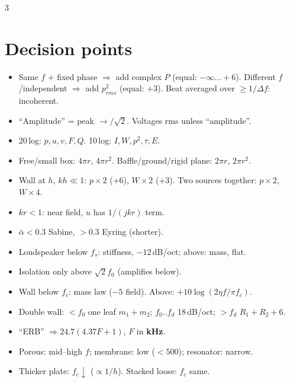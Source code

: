 \documentclass[10pt]{article}
\begin{document}
\begin{multicols*}{3}
\section{Decision points}
\begin{itemize}
\item Same $f$ + fixed phase $\Rightarrow$ add complex $P$ (equal: $-\infty\ldots+6$). Different $f$/independent $\Rightarrow$ add $p^2_{rms}$ (equal: $+3$). Beat averaged over $\ge1/\Delta f$: incoherent.
\item ``Amplitude'' = peak $\to/\sqrt2$. Voltages rms unless ``amplitude''.
\item 20\,log: $p,u,v,F,Q$. 10\,log: $I,W,p^2,\tau,E$.
\item Free/small box: $4\pi r$, $4\pi r^2$. Baffle/ground/rigid plane: $2\pi r$, $2\pi r^2$.
\item Wall at $h$, $kh\ll1$: $p\times2$ (+6), $W\times2$ (+3). Two sources together: $p\times2$, $W\times4$.
\item $kr<1$: near field, $u$ has $1/(jkr)$ term.
\item $\bar\alpha<0.3$ Sabine, $>0.3$ Eyring (shorter).
\item Loudspeaker below $f_s$: stiffness, $-12$\,dB/oct; above: mass, flat.
\item Isolation only above $\sqrt2f_0$ (amplifies below).
\item Wall below $f_c$: mass law ($-5$ field). Above: $+10\log(2\eta f/\pi f_c)$.
\item Double wall: $<f_0$ one leaf $m_1+m_2$; $f_0..f_d$ 18\,dB/oct; $>f_d$ $R_1+R_2+6$.
\item ``ERB'' $\Rightarrow 24.7(4.37F+1)$, $F$ in \textbf{kHz}.
\item Porous: mid--high $f$; membrane: low ($<500$); resonator: narrow.
\item Thicker plate: $f_c\downarrow$ ($\propto1/h$). Stacked loose: $f_c$ same.
\end{itemize}


\end{multicols*}
\end{document}
